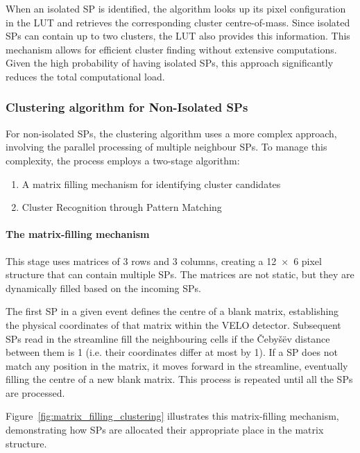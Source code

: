 When an isolated SP is identified, the algorithm looks up its pixel configuration in the LUT and retrieves the corresponding cluster centre-of-mass. Since isolated SPs can contain up to two clusters, the LUT also provides this information. This mechanism allows for efficient cluster finding without extensive computations. Given the high probability of having isolated SPs, this approach significantly reduces the total computational load.

\subsubsection{Clustering algorithm for Non-Isolated SPs}
For non-isolated SPs, the clustering algorithm uses a more complex approach, involving the parallel processing of multiple neighbour SPs. To manage this complexity, the process employs a two-stage algorithm\cite{Lazzari:2813167}:
\begin{enumerate}
    \item A matrix filling mechanism for identifying cluster candidates
    \item Cluster Recognition through Pattern Matching
\end{enumerate}

\paragraph{The matrix-filling mechanism}
This stage uses matrices of 3 rows and 3 columns, creating a 12~×~6 pixel structure that can contain multiple SPs. The matrices are not static, but they are dynamically filled based on the incoming SPs.

The first SP in a given event defines the centre of a blank matrix, establishing the physical coordinates of that matrix within the VELO detector. Subsequent SPs read in the streamline fill the neighbouring cells if the Čebyšëv distance between them is 1 (i.e. their coordinates differ at most by 1). If a SP does not match any position in the matrix, it moves forward in the streamline, eventually filling the centre of a new blank matrix. This process is repeated until all the SPs are processed.

Figure~\ref{fig:matrix_filling_clustering} illustrates this matrix-filling mechanism, demonstrating how SPs are allocated their appropriate place in the matrix structure.

